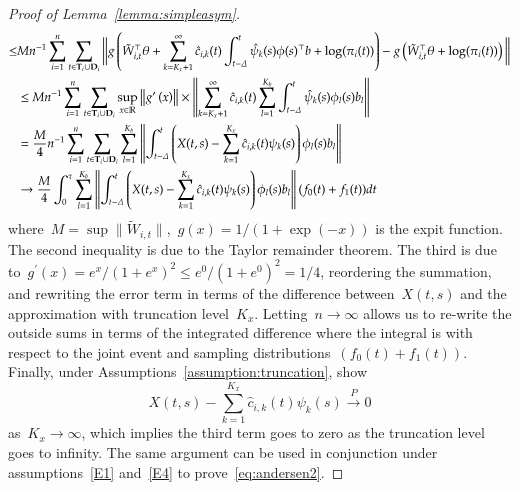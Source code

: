 \documentclass[12pt]{amsart}
\def\bfT{{\bf T}}
\def\bfD{{\bf D}}
\begin{document}
\begin{proof}[Proof of Lemma~\ref{lemma:simpleasym}]
\begin{align*}
  \leq & M n^{-1} \sum_{i=1}^n \sum_{t \in \bfT_i \cup \bfD_i} \bigg \| g
         \left( \tilde W_{i,t}^\top \theta  + \sum_{k=K_x+1}^\infty \hat
         c_{i,k} (t) \int_{t-\Delta}^t \hat \psi_k (s) \phi (s)^\top b
         + \log (\pi_i (t) ) \right) - g \left( \tilde W_{i,t}^\top
         \theta + \log (\pi_i (t)) \right) \bigg \| \\
&\leq M n^{-1} \sum_{i=1}^n \sum_{t \in \bfT_i \cup \bfD_i}
    \sup_{x \in \mathbb{R}} \left \| g^\prime \left( x \right)
  \right\| \times \left \| \sum_{k=K_x+1}^\infty \hat c_{i,k} (t)
  \sum_{l=1}^{K_b} \int_{t-\Delta}^t \hat \psi_k (s) \phi_l (s) b_l
  \right \| \\
&= \frac{M}{4} n^{-1} \sum_{i=1}^n \sum_{t \in \bfT_i \cup \bfD_i}
  \sum_{l=1}^{K_b} \left \| \int_{t-\Delta}^t
  \left( X(t,s) - \sum_{k=1}^{K_x} \hat c_{i,k} (t) \psi_k (s) \right)
  \phi_l (s) b_l\right \| \\
&\to \frac{M}{4} \int_0^\tau \sum_{l=1}^{K_b} \left \| \int_{t-\Delta}^t
  \left( X(t,s) - \sum_{k=1}^{K_x} \hat c_{i,k} (t) \psi_k (s) \right)
  \phi_l (s) b_l\right \| (f_0(t) + f_1(t)) dt
\end{align*}
where~$M = \sup \| \tilde W_{i,t} \|$,~$g(x) = 1/(1+\exp(-x))$ is the
expit function.
The second inequality is due to the Taylor remainder theorem. The third is due to~$g^\prime (x) = e^x/(1+e^x)^2 \leq e^0/(1+e^0)^2 = 1/4$, reordering the summation, and rewriting the error term in terms of the difference between~$X(t,s)$ and the approximation with truncation level~$K_x$. Letting~$n \to \infty$ allows us to re-write the outside sums in terms of the integrated difference where the integral is with respect to the joint event and sampling distributions~$(f_0(t) + f_1 (t))$. Finally, under Assumptions~\ref{assumption:truncation}, \cite{Park2018} show
\[
X(t,s) - \sum_{k=1}^{K_x} \hat c_{i,k} (t) \psi_k (s) \overset{P}{\to} 0
\]
as~$K_x \to \infty$, which implies the third term goes to zero as the truncation level goes to infinity. The same argument can be used in conjunction under assumptions~\ref{E1} and~\ref{E4} to prove~\eqref{eq:andersen2}.


\end{proof}
\end{document}
